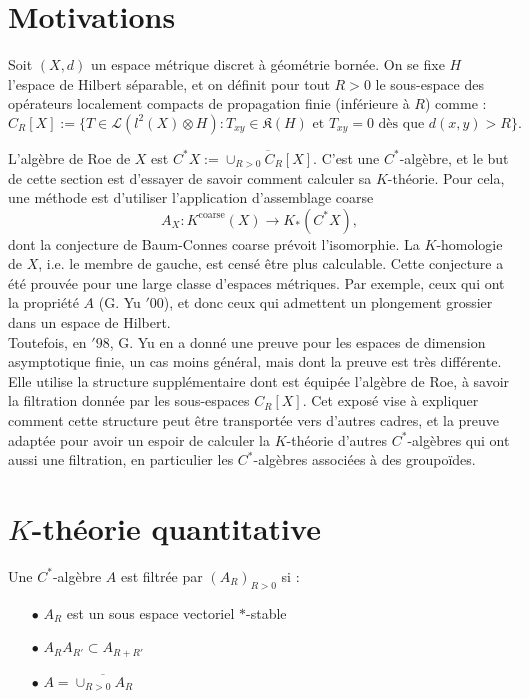 \section{Motivations}

Soit $(X,d)$ un espace métrique discret à géométrie bornée. On se fixe $H$ l'espace de Hilbert séparable, et on définit pour tout $R>0$ le sous-espace des opérateurs localement compacts de propagation finie (inférieure à $R$) comme :
\[C_R[X]:=\{T\in \mathcal L(l^2(X)\otimes H) : T_{xy}\in \mathfrak K(H)\text{ et } T_{xy}= 0 \text{ dès que } d(x,y)>R\}.\] 

L'algèbre de Roe de $X$ est $C^*X:=\overline{\cup_{R>0} C_R[X]}$. C'est une $C^*$-algèbre, et le but de cette section est d'essayer de savoir comment calculer sa $K$-théorie. Pour cela, une méthode est d'utiliser l'application d'assemblage coarse 
\[A_X : K^{\text{coarse}}(X)\rightarrow K_*(C^*X),\]
dont la conjecture de Baum-Connes coarse prévoit l'isomorphie. La $K$-homologie de $X$, i.e. le membre de gauche, est censé être plus calculable. Cette conjecture a été prouvée pour une large classe d'espaces métriques. Par exemple, ceux qui ont la propriété $A$ (G. Yu $'00$), et donc ceux qui admettent un plongement grossier dans un espace de Hilbert.\\

 Toutefois, en $'98$, G. Yu en a donné une preuve pour les espaces de dimension asymptotique finie, un cas moins général, mais dont la preuve est très différente. Elle utilise la structure supplémentaire dont est équipée l'algèbre de Roe, à savoir la filtration donnée par les sous-espaces $C_R[X]$. Cet exposé vise à expliquer comment cette structure peut être transportée vers d'autres cadres, et la preuve adaptée pour avoir un espoir de calculer la $K$-théorie d'autres $C^*$-algèbres qui ont aussi une filtration, en particulier les $C^*$-algèbres associées à des groupoïdes.

\section{$K$-théorie quantitative}

\begin{definition}
Une $C^*$-algèbre $A$ est filtrée par $(A_R)_{R>0}$ si :
\begin{itemize}
\item[$\bullet$] $A_R$ est un sous espace vectoriel $*$-stable
\item[$\bullet$] $A_R A_{R'}\subset A_{R+R'}$
\item[$\bullet$] $A=\overline{\cup_{R>0} A_R}$
\end{itemize}
\end{definition}

